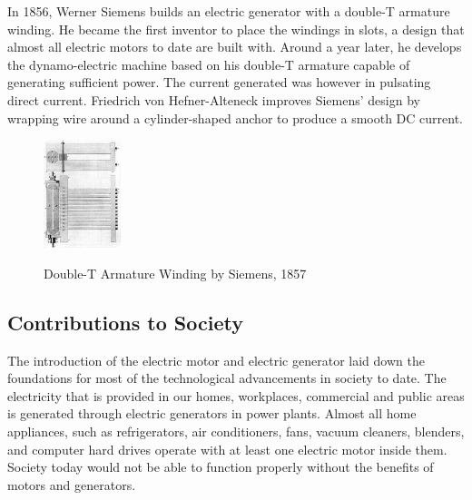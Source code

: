     \noindent
    In 1856, Werner Siemens builds an electric generator with a double-T armature winding. He became the first inventor to place the windings in slots, a design that almost all electric motors to date are built with. \cite{needcite} Around a year later, he develops the dynamo-electric machine based on his double-T armature capable of generating sufficient power. The current generated was however in pulsating direct current. Friedrich von Hefner-Alteneck improves Siemens’ design by wrapping wire around a cylinder-shaped anchor to produce a smooth DC current. \cite{needcite} 

    \begin{figure}[ht]
        \begin{center}
            \includegraphics[width=0.2\textwidth]{figures/history/siemens.jpg}
            \label{fig:siemens} \caption{Double-T Armature Winding by Siemens, 1857}
        \end{center}
    \end{figure}

    \subsection{Contributions to Society}
    The introduction of the electric motor and electric generator laid down the foundations for most of the technological advancements in society to date. The electricity that is provided in our homes, workplaces, commercial and public areas is generated through electric generators in power plants. Almost all home appliances, such as refrigerators, air conditioners, fans, vacuum cleaners, blenders, and computer hard drives operate with at least one electric motor inside them. Society today would not be able to function properly without the benefits of motors and generators.

    \clearpage
